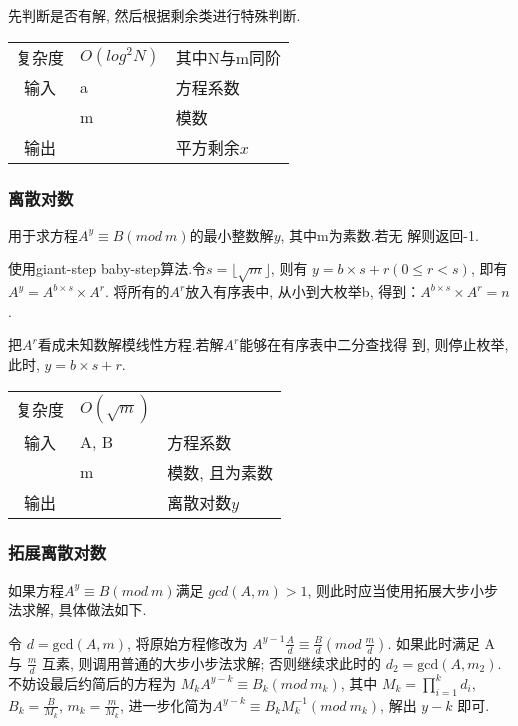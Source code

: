 先判断是否有解, 然后根据剩余类进行特殊判断.
\begin{longtable}{|c|l|l|}
复杂度 & $O(log^{2}N)$ & 其中N与m同阶  \\
输入 & a & 方程系数 \\
 & m & 模数 \\
输出 &  & 平方剩余$x$ \\
\end{longtable}



        \subsubsection{离散对数}\small
用于求方程$A^{y} \equiv B(mod\ m)$的最小整数解$y$, 其中m为素数.若无
解则返回-1.

使用giant-step baby-step算法.令$s = \lfloor \sqrt{m} \rfloor$, 则有
$y = b \times s + r(0 \leq r < s)$, 
即有$A^{y} = A^{b \times s} \times A^{r}$.
将所有的$A^{r}$放入有序表中, 从小到大枚举b, 
得到：$A^{b \times s} \times A^{r} = n$.

把$A^{r}$看成未知数解模线性方程.若解$A^{r}$能够在有序表中二分查找得
到, 则停止枚举, 此时, $y = b \times s + r$.
\begin{longtable}{|c|l|l|}
复杂度 & $O(\sqrt{m})$ &  \\
输入 & A, B & 方程系数 \\
 & m & 模数, 且为素数 \\
输出 &  & 离散对数$y$ \\
\end{longtable}



        \subsubsection{拓展离散对数}\small
如果方程$A^{y} \equiv B(mod\ m)$满足 $gcd(A, m) > 1$, 则此时应当使用拓展大步小步法求解, 具体做法如下.

令 $d = \text{gcd}(A, m)$, 将原始方程修改为 $A^{y - 1} \frac{A}{d} \equiv \frac{B}{d}(mod\ \frac{m}{d})$. 如果此时满足 A 与 $\frac{m}{d}$ 互素, 则调用普通的大步小步法求解; 否则继续求此时的 $d_2 = \text{gcd}(A, m_2)$. 不妨设最后约简后的方程为 $M_k A^{y-k} \equiv B_k(mod\ m_k)$, 其中 $M_k = \prod^k_{i=1}d_i$, $B_k = \frac{B}{M_k}$, $m_k = \frac{m}{M_k}$, 进一步化简为$A^{y-k} \equiv B_k M_k^{-1}(mod\ m_k)$, 解出 $y-k$ 即可.

